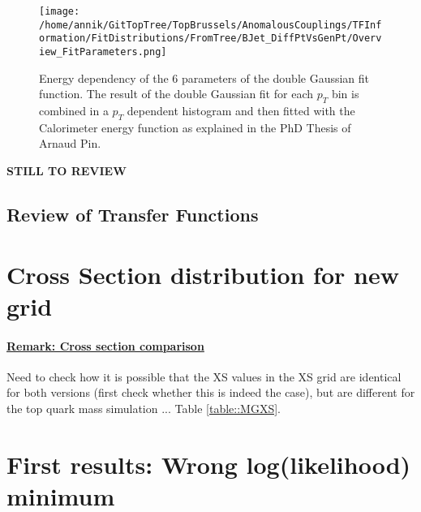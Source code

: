\begin{figure}[!h]
  \centering
  \texttt{[image: /home/annik/GitTopTree/TopBrussels/AnomalousCouplings/TFInformation/FitDistributions/FromTree/BJet\_DiffPtVsGenPt/Overview\_FitParameters.png]}
  \caption{Energy dependency of the 6 parameters of the double Gaussian fit function. The result of the double Gaussian fit for each $p_T$ bin is combined in a $p_T$ dependent histogram and then fitted with the Calorimeter energy function as explained in the PhD Thesis of Arnaud Pin.} \label{fig::FitParamsBJetPt}
\end{figure}

\newpage
\textbf{STILL TO REVIEW}
\newpage
\subsection{Review of Transfer Functions}

\newpage
\section{Cross Section distribution for new grid}
\paragraph{\underline{Remark: Cross section comparison}\\}
Need to check how it is possible that the XS values in the XS grid are identical for both versions (first check whether this is indeed the case), but are different for the top quark mass simulation ... Table \ref{table::MGXS}.

\section{First results: Wrong log(likelihood) minimum}

